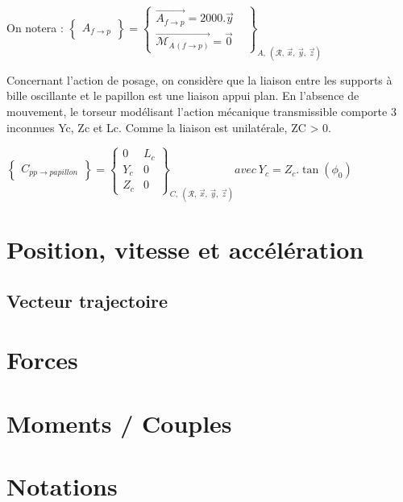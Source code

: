 \documentclass[
	11pt, %
	fleqn, %
	a4paper, %
]{LegrandOrangeBook}
\begin{document}
\begin{Extrait}
On notera :
$\displaystyle \begin{Bmatrix}
A_{f\rightarrow p}
\end{Bmatrix} =\begin{Bmatrix}
\overrightarrow{A_{f\rightarrow p}} =2000.\vec{y} & \\
\overrightarrow{\mathcal{M}_{A}{}_{\left( f\rightarrow p\right)}} =\vec{0} & 
\end{Bmatrix}_{A,\ (\mathcal{R} ,\ \vec{x} ,\ \vec{y} ,\ \vec{z})}$

Concernant l’action de posage, on considère que la liaison entre les supports à bille
oscillante et le papillon est une liaison appui plan. En l’absence de mouvement, le
torseur modélisant l’action mécanique transmissible comporte 3 inconnues Yc, Zc et Lc.
Comme la liaison est unilatérale, ZC > 0.

$\displaystyle \begin{Bmatrix}
C_{pp\rightarrow papillon}
\end{Bmatrix} =\begin{Bmatrix}
0 & L_{c}\\
Y_{c} & 0\\
Z_{c} & 0
\end{Bmatrix}_{C,\ (\mathcal{R} ,\ \vec{x} ,\ \vec{y} ,\ \vec{z})} avec\ Y_{c} =Z_{c} .\tan( \phi_{0})$


\end{Extrait}






\section{Position, vitesse et accélération}
\subsection{Vecteur trajectoire}

\section{Forces}

\section{Moments / Couples}

\section{Notations}
\end{document}
